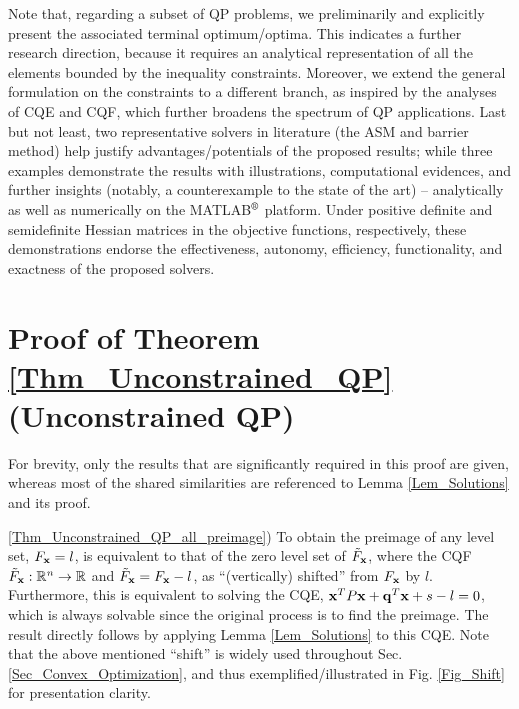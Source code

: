 \documentclass[9pt,twocolumn,twoside,lineno]{pnas-new-1}
\newcommand{\bfx}{{\bf x}}
\newcommand{\bfq}{{\bf q}}
\newcommand{\real}{\mathbb{R}}
\newcommand{\itn}{{\it n}}
\theoremstyle{remark}
\begin{document}
Note that, regarding a subset of QP problems, we preliminarily and explicitly present the associated terminal optimum/optima. This indicates a further research direction, because it requires an analytical representation of all the elements bounded by the inequality constraints. Moreover, we extend the general formulation on the constraints to a different branch, as inspired by the analyses of CQE and CQF, which further broadens the spectrum of QP applications. Last but not least, two representative solvers in literature (the ASM and barrier method) help justify advantages/potentials of the proposed results; while three examples demonstrate the results with illustrations, computational evidences, and further insights (notably, a counterexample to the state of the art) -- analytically as well as numerically on the MATLAB$\textsuperscript{\textregistered}$ platform. Under positive definite and semidefinite Hessian matrices in the objective functions, respectively, these demonstrations endorse the effectiveness, autonomy, efficiency, functionality, and exactness of the proposed solvers.

\appendix

\section{Proof of Theorem \ref{Thm_Unconstrained_QP} (Unconstrained QP)}
\label{App_Proof_Unconstrained_QP}

For brevity, only the results that are significantly required in this proof are given, whereas most of the shared similarities are referenced to Lemma \ref{Lem_Solutions} and its proof.

\noindent\ref{Thm_Unconstrained_QP_all_preimage}) To obtain the preimage of any level set, $F_\bfx=l$, is equivalent to that of the zero level set of $\tilde F_\bfx$, where the CQF $\tilde F_\bfx:\real^\itn\rightarrow\real$ and $\tilde F_\bfx=F_\bfx-l$, as ``(vertically) shifted'' from $F_\bfx$ by $l$. Furthermore, this is equivalent to solving the CQE, $\bfx^TP\bfx+\bfq^T\bfx+s-l=0$, which is always solvable since the original process is to find the preimage. The result directly follows by applying Lemma \ref{Lem_Solutions} to this CQE. Note that the above mentioned ``shift'' is widely used throughout Sec. \ref{Sec_Convex_Optimization}, and thus exemplified/illustrated in Fig. \ref{Fig_Shift} for presentation clarity.\vspace{0.16cm}
\end{document}
